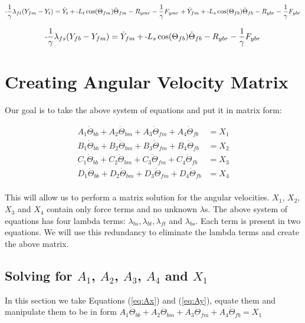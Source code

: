 \documentclass[11pt, landscape]{article}
\newcommand{\mn}{\scalebox{0.7}[1.0]{-}}
\begin{document}
\begin{equation}
\mn\frac{1}{\gamma}\lambda_{ft}(Y_{fm} - Y_{t }) =
\dot{Y}_{t } + \mn L_{t}\cos(\Theta_{fm})\dot{\Theta}_{fm} - R_{ymr} - \frac{1}{\gamma}F_{ymr} + \dot{Y}_{fm} + \mn L_{s}\cos(\Theta_{fb})\dot{\Theta}_{fb}
- R_{ybr} - \frac{1}{\gamma}F_{ybr}
\label{eq:Cy}
\end{equation}%

\begin{equation}
\mn\frac{1}{\gamma}\lambda_{fs}(Y_{fb} - Y_{fm}) = \dot{Y}_{fm} + \mn L_{s}\cos(\Theta_{fb})\dot{\Theta}_{fb} - R_{ybr} - \frac{1}{\gamma}F_{ybr}
\label{eq:Dy}
\end{equation}%

\section{Creating Angular Velocity Matrix}

Our goal is to take the above system of equations and put it in matrix form: 


\begin{align}
  A_1\dot{\Theta}_{bb} + A_2 \dot{\Theta}_{bm} + A_3 \dot{\Theta}_{fm} + A_4 \dot{\Theta}_{fb} &= X_1 \\
  B_1\dot{\Theta}_{bb} + B_2 \dot{\Theta}_{bm} + B_3 \dot{\Theta}_{fm} + B_4 \dot{\Theta}_{fb} &= X_2 \\
  C_1\dot{\Theta}_{bb} + C_2 \dot{\Theta}_{bm} + C_3 \dot{\Theta}_{fm} + C_4 \dot{\Theta}_{fb} &= X_3 \\
  D_1\dot{\Theta}_{bb} + D_2 \dot{\Theta}_{bm} + D_3 \dot{\Theta}_{fm} + D_4 \dot{\Theta}_{fb} &= X_4 \\
\end{align}

This will allow us to perform a matrix solution for the angular velocities. $X_1$, $X_2$, $X_3$ and $X_4$ contain only force terms and no unknown $\lambda$s. The above system of equations has four lambda terms: $\lambda_{bs}, \lambda_{bt}, \lambda_{ft}$ and $\lambda_{bs}$. Each term is present in two equations. We will use this redundancy to eliminate the lambda terms and create the above matrix.

\subsection{Solving for $A_1$, $A_2$, $A_3$, $A_4$ and $X_1$}
In this section we take Equations (\ref{eq:Ax}) and (\ref{eq:Ay}), equate them and manipulate them to be in form $A_1\dot{\Theta}_{bb} + A_2 \dot{\Theta}_{bm} + A_3 \dot{\Theta}_{fm} + A_4 \dot{\Theta}_{fb} = X_1$\\
\end{document}
